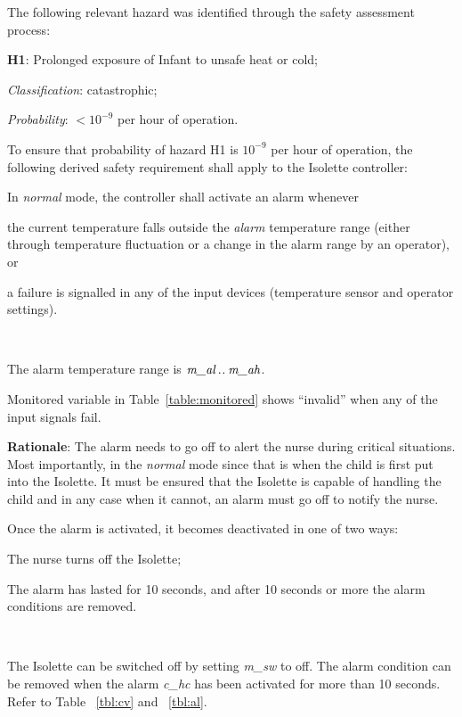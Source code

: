 \documentclass[fontsize=12pt,paper=letter,twoside]{scrartcl}
\begin{document}
The following relevant hazard was identified through the safety assessment process:
\begin{mylist}
\item \textbf{H1}: Prolonged exposure of Infant to unsafe heat or cold;
\item \emph{Classification}: catastrophic;
\item \emph{Probability}: $<10^{-9}$ per hour of operation.
\end{mylist}

\noindent To ensure that probability of hazard H1 is $10^{-9}$ per hour of operation, the following derived safety requirement shall apply to the Isolette controller: 

\rdescription
{In \emph{normal} mode, the controller shall activate an alarm whenever 

\begin{mylist}
\item the current temperature falls outside the \emph{alarm} temperature range (either through temperature fluctuation or a change in the alarm range by an operator), or
\item a failure is signalled in any of the input devices (temperature sensor and operator settings).
\end{mylist}~}
{The alarm temperature range is $\textit{m\_al}\mathbin{.\mkern1mu.}\textit{m\_ah}$.

Monitored variable  
in Table~\ref{table:monitored} 
shows ``invalid'' when any of the input signals fail.}
\label{R3}

\smallskip
\noindent \textbf{Rationale}: The alarm needs to go off to alert the nurse during critical situations. Most importantly, in the \emph{normal} mode since that is when the child is first put into the Isolette. It must be ensured that the Isolette is capable of handling the child and in any case when it cannot, an alarm must go off to notify the nurse.

\rdescription
{Once the alarm is activated, it becomes deactivated in one of two ways:
\begin{mylist}
\item The nurse turns off the Isolette;
\item The alarm has lasted for 10 seconds, and after 10 seconds or more the alarm conditions are removed.
\end{mylist}~\\}
{The Isolette can be switched off by setting \emph{m\_sw} to off. The alarm condition can be removed when the alarm \emph{c\_hc} has been activated for more than 10 seconds. Refer to Table  ~\ref{tbl:cv} and ~\ref{tbl:al}.}
\label{R4}
\end{document}
